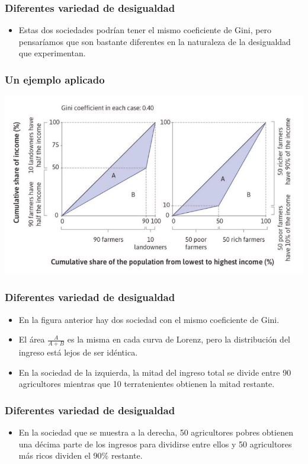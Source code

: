 \documentclass{beamer}
\begin{document}
\begin{frame} 
\frametitle{ Diferentes variedad de desigualdad}
\begin{itemize}
\item Estas dos sociedades podrían tener el mismo coeficiente de Gini, pero pensaríamos que son bastante diferentes en la naturaleza de la desigualdad que experimentan.
\end{itemize}
\end{frame}

\begin{frame} 
\frametitle{ Un ejemplo aplicado}
    \begin{center}    
    \includegraphics[scale=0.55]{Tema_04.20_variedaddesigual.jpg}
    \end{center}
\end{frame}

\begin{frame} 
\frametitle{ Diferentes variedad de desigualdad}
\begin{itemize}
\item En la figura anterior hay dos sociedad con el mismo coeficiente de Gini.
\item El área $\frac{A}{A + B}$ es la misma en cada curva de Lorenz, pero la distribución del ingreso está lejos de ser idéntica.
\item En la sociedad de la izquierda, la mitad del ingreso total se divide entre 90 agricultores mientras que 10 terratenientes obtienen la mitad restante. 
\end{itemize}
\end{frame}

\begin{frame} 
\frametitle{ Diferentes variedad de desigualdad}
\begin{itemize}
\item En la sociedad que se muestra a la derecha, 50 agricultores pobres obtienen una décima parte de los ingresos para dividirse entre ellos y 50 agricultores más ricos dividen el 90\% restante.
\end{itemize}
\end{frame}
\end{document}
